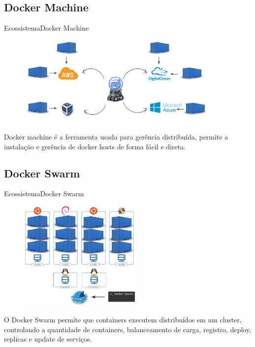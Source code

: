\subsection{Docker Machine}
\begin{frame}{Ecossistema}{Docker Machine}
  \begin{figure}[ht!]
    \centering
    \includegraphics[width=100mm]{images/docker_machine}
  \end{figure}
  Docker machine é a ferramenta usada para gerência distribuída, permite a instalação e gerência de docker hosts de forma fácil e direta.
\end{frame}

\subsection{Docker Swarm}
\begin{frame}{Ecossistema}{Docker Swarm}
  \begin{figure}[ht!]
    \centering
    \includegraphics[width=60mm]{images/docker_swarm}
  \end{figure}
  O Docker Swarm permite que containers executem distribuídos em um cluster, controlando a quantidade de containers, balanceamento de carga, registro, deploy, replicas e update de serviços.
\end{frame}

